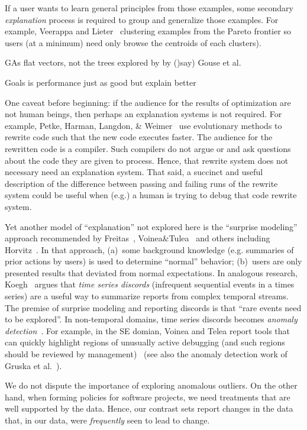 \documentclass[runningheads]{llncs}
\begin{document}
If a user wants to learn general principles from those examples,
some secondary {\em explanation} process is required to group and generalize those
examples.
For example,  Veerappa and Lieter~\cite{veerappa11} clustering examples from the Pareto
frontier so users (at a minimum) need only browse the centroids of each clusters).



GAs flat vectors, not the trees explored by by ()say) Gouse et al.

Goals is performance just as good but explain better

One caveat before beginning: if the audience for the
results of optimization are not human beings, then
perhaps an explanation systems is not required. For
example, Petke, Harman, Langdon, \&
Weimer~\cite{petke14} use evolutionary methods to
rewrite code such that the new code executes
faster. The audience for the rewritten code is a
compiler. Such compilers do not argue or and ask
questions about the code they are given to process.
Hence, that rewrite system does not necessary need
an explanation system.  That said, a succinct and
useful description of the difference between passing
and failing runs of the rewrite system could be
useful when (e.g.) a human is trying to debug that
code rewrite system.


Yet another model of ``explanation'' not explored
here is the ``surprise modeling'' approach
recommended by 
Freitas~\cite{Freitas98onobjective}, Voinea\&Tulea~\cite{voinea07} and
others including Horvitz~\cite{horvitz05}. In that
approach, (a)~some background knowledge
(e.g. summaries of prior actions by users) is used
to determine ``normal'' behavior; (b)~users are only
presented results that deviated from normal
expectations. In analogous research,
Koegh~\cite{keogh05} argues that {\em time series
  discords} (infrequent sequential events in a times
series) are a useful way to summarize reports from
complex temporal streams. The premise of surprise
modeling and reporting discords is that ``rare
events need to be explored''.  
In non-temporal domains, time series discords becomes
{\em anomaly detection}~\cite{chandola09}. For example, in the SE domian,
Voinea and Telea report tools that can quickly highlight regions
of unusually active debugging (and such regions should be reviewed
by management)~\cite{voiena07} (see also the anomaly
detection work of Gruska et al.~\cite{gruska10}).

We do not dispute the
importance of exploring anomalous outliers.  On the other
hand, when forming policies for software projects,
we need treatments that are well supported by the
data. Hence, our contrast sets report changes in the
data that, in our data, were {\em frequently} seen to
lead to change. 
\end{document}

